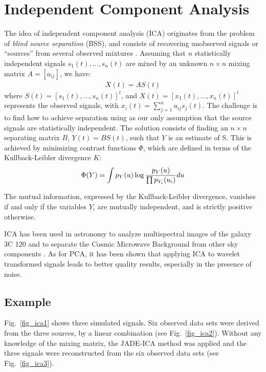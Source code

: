 \newpage

\section{Independent Component Analysis}

The idea of independent component analysis (ICA) originates from
the problem of {\em blind source separation} (BSS), and consists of
recovering unobserved signals or ``sources'' from several observed mixtures
\cite{mc:cardoso98}. Assuming that $n$ statistically independent 
signals $s_1(t), ..., s_n(t)$ are mixed by an unknown $n \times n$ mixing  
matrix $A=[a_{ij}]$, we have:
\begin{eqnarray}
X(t) = A S(t)
\end{eqnarray}
where $S(t) = [ s_1(t), \dots, s_n(t) ]^t$, and
 $X(t) = [ x_1(t), \dots, x_n(t) ]^t$ represents the observed signals, with 
 $x_i(t) = \sum_{j=1}^n a_{ij} s_j(t)$.  
The challenge is to find how to achieve separation using as our
only assumption that
the source signals are statistically independent. The solution  
consists of finding 
an $n \times n$ separating matrix $B$, $Y(t) = B S(t)$, such that   
$Y$ is an estimate of S.
This is achieved by minimizing contrast functions $\Phi$, which are defined 
in terms of the Kullback-Leibler divergence  $K$:
\begin{eqnarray}
\Phi(Y) = \int p_Y(u) \log{ {p_Y(u) \over \prod p_{Y_i}(u_i) }} du
\end{eqnarray}

The mutual information, expressed by the  Kullback-Leibler divergence, 
vanishes if and only if the variables
$Y_i$ are mutually independent, and is strictly positive otherwise.

ICA has been used in astronomy to analyze multispectral 
images \cite{mc:bijaoui00} of the galaxy 3C 120 and to separate 
the Cosmic Microwave Background
from other sky components \cite{mc:bacci00}.
As for PCA, it has been shown \cite{mc:zibu99,mc:zibu01} that applying 
ICA to  wavelet transformed signals leads to better quality results,
especially in the presence of noise.

\subsection*{Example}
Fig.~\ref{fig_ica1} shows three simulated signals. Six observed data sets
were derived from the three sources, by a linear combination
(see Fig.~\ref{fig_ica2}). Without any knowledge of the mixing matrix,
the JADE-ICA \cite{mc:cardoso98} method was applied and the 
three signals were
reconstructed from the six observed data sets (see Fig.~\ref{fig_ica3}).


